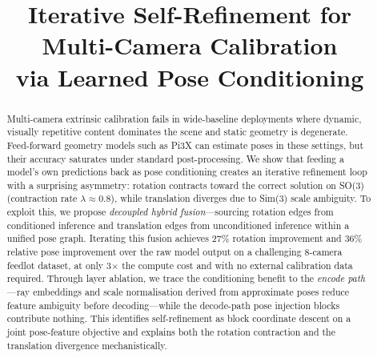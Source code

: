 \documentclass[11pt]{article}
\title{Iterative Self-Refinement for Multi-Camera Calibration\\via Learned Pose Conditioning}
\author{}
\date{}
\begin{document}
\maketitle

\begin{abstract}
Multi-camera extrinsic calibration fails in wide-baseline deployments where dynamic, visually repetitive content dominates the scene and static geometry is degenerate. Feed-forward geometry models such as Pi3X can estimate poses in these settings, but their accuracy saturates under standard post-processing. We show that feeding a model's own predictions back as pose conditioning creates an iterative refinement loop with a surprising asymmetry: rotation contracts toward the correct solution on SO(3) (contraction rate $\lambda \approx 0.8$), while translation diverges due to Sim(3) scale ambiguity. To exploit this, we propose \emph{decoupled hybrid fusion}---sourcing rotation edges from conditioned inference and translation edges from unconditioned inference within a unified pose graph. Iterating this fusion achieves 27\% rotation improvement and 36\% relative pose improvement over the raw model output on a challenging 8-camera feedlot dataset, at only 3$\times$ the compute cost and with no external calibration data required. Through layer ablation, we trace the conditioning benefit to the \emph{encode path}---ray embeddings and scale normalisation derived from approximate poses reduce feature ambiguity before decoding---while the decode-path pose injection blocks contribute nothing. This identifies self-refinement as block coordinate descent on a joint pose-feature objective and explains both the rotation contraction and the translation divergence mechanistically.
\end{abstract}













\end{document}
